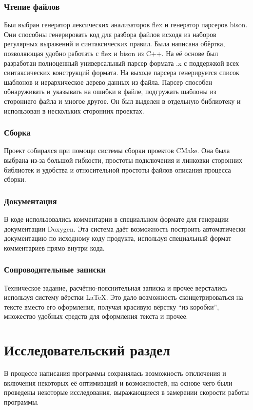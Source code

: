 \documentclass[a4paper,12pt]{report}
\begin{document}
\subsubsection{Чтение файлов}
Был выбран генератор лексических анализаторов flex и генератор парсеров bison. Они способны генерировать код для разбора файлов исходя из наборов регулярных выражений и синтаксических правил. Была написана обёртка, позволяющая удобно работать с flex и bison из C++. На её основе был разработан полноценный универсальный парсер формата .x с поддержкой всех синтаксических конструкций формата. На выходе парсера генерируется список шаблонов и иерархическое дерево данных из файла. Парсер способен обнаруживать и указывать на ошибки в файле, подгружать шаблоны из стороннего файла и многое другое. Он был выделен в отдельную библиотеку и использован в нескольких сторонних проектах.

\subsubsection{Сборка}
Проект собирался при помощи системы сборки проектов CMake. Она была выбрана из-за большой гибкости, простоты подключения и линковки сторонних библиотек и удобства и относительной простоты файлов описания процесса сборки.

\subsubsection{Документация}
В коде использовались комментарии в специальном формате для генерации документации Doxygen. Эта система даёт возможность построить автоматически документацию по исходному коду продукта, используя специальный формат комментариев прямо внутри кода.

\subsubsection{Сопроводительные записки}
Техническое задание, расчётно-пояснительная записка и прочее верстались используя систему вёрстки \LaTeX . Это дало возможность сконцетрироваться на тексте вместо его оформления, получая красивую вёрстку ``из коробки'', множество удобных средств для оформления текста и прочее.

\section{Исследовательский раздел}
В процессе написания программы сохранялась возможность отключения и включения некоторых её оптимизаций и возможностей, на основе чего были проведены некоторые исследования, выражающиеся в замерении скорости работы программы.
\end{document}
